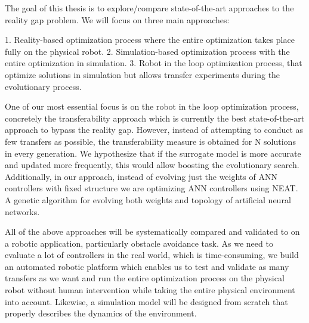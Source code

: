 The goal of this thesis is to explore/compare state-of-the-art approaches to the reality gap problem. We will focus on three main approaches:

1. Reality-based optimization process where the entire optimization takes place fully on the physical robot.
2. Simulation-based optimization process with the entire optimization in simulation.
3. Robot in the loop optimization process, that optimize solutions in simulation but allows transfer experiments during the evolutionary process.

One of our most essential focus is on the robot in the loop optimization process, concretely the transferability approach which is currently the best state-of-the-art approach to bypass the reality gap. However,  instead of attempting to conduct as few transfers as possible, the transferability measure is obtained for N solutions in every generation. We hypothesize that if the surrogate model is more accurate and updated more frequently, this would allow boosting the evolutionary search. Additionally, in our approach, instead of evolving just the weights of ANN controllers with fixed structure we are optimizing ANN controllers using NEAT.  A genetic algorithm for evolving both weights and topology of artificial neural networks.

All of the above approaches will be systematically compared and validated to on a robotic application, particularly obstacle avoidance task. As we need to evaluate a lot of controllers in the real world, which is time-consuming, we build an automated robotic platform which enables us to test and validate as many transfers as we want and run the entire optimization process on the physical robot without human intervention while taking the entire physical environment into account. Likewise, a simulation model will be designed from scratch that properly describes the dynamics of the environment.